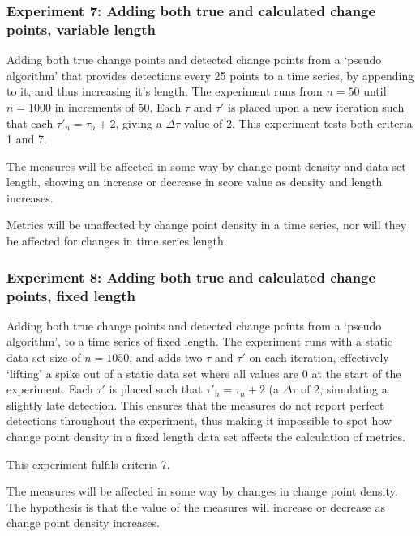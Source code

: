\documentclass[../main.tex]{subfiles}
\begin{document}
\subsubsection{Experiment 7: Adding both true and calculated change points, variable length}

Adding both true change points and detected change points from a `pseudo algorithm' that provides detections every 25 points to a time series, by appending to it, and thus increasing it's length. The experiment runs from $n=50$ until $n=1000$ in increments of 50. Each $\tau$ and $\tau'$ is placed upon a new iteration such that each $\tau'_n = \tau_n + 2$, giving a $\Delta \tau$ value of 2. This experiment tests both criteria 1 and 7.

\begin{hypothesis}
    The measures will be affected in some way by change point density and data set length, showing an increase or decrease in score value as density and length increases.
\end{hypothesis}

\begin{nullhypothesis}
    Metrics will be unaffected by change point density in a time series, nor will they be affected for changes in time series length.
\end{nullhypothesis}

\subsubsection{Experiment 8: Adding both true and calculated change points, fixed length}

Adding both true change points and detected change points from a `pseudo algorithm', to a time series of fixed length. The experiment runs with a static data set size of $n=1050$, and adds two $\tau$ and $\tau'$ on each iteration, effectively `lifting' a spike out of a static data set where all values are 0 at the start of the experiment. Each $\tau'$ is placed such that $\tau'_n = \tau_n + 2$ (a $\Delta \tau$ of 2, simulating a slightly late detection. This ensures that the measures do not report perfect detections throughout the experiment, thus making it impossible to spot how change point density in a fixed length data set affects the calculation of metrics.

This experiment fulfils criteria 7.

\begin{hypothesis}
    The measures will be affected in some way by changes in change point density. The hypothesis is that the value of the measures will increase or decrease as change point density increases.
\end{hypothesis}
\end{document}

